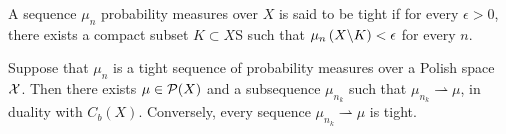 \begin{definition}
	A sequence $\mu_n$ probability measures over $X$ is said to be tight if for every $\epsilon> 0$, there exists a compact subset $K\subset X$S such that $\mu_n\left( X\backslash K \right)< \epsilon$ for every $n$.
\end{definition}


\begin{theorem}[Prokhorov]
	Suppose that $\mu_n $ is a tight sequence of probability measures over a Polish space $\mathcal{X}$. Then there exists $\mu\in\mathcal{P}(X)$ and a subsequence $\mu_{n_k}$ such that $\mu_{n_k}\rightharpoonup \mu $, in duality with $C_b(X)$. Conversely, every sequence $\mu_{n_k}\rightharpoonup \mu$ is tight.
\end{theorem}
